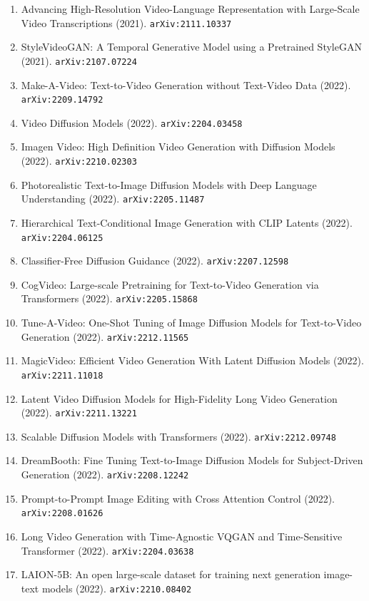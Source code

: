 \documentclass[11pt]{article}
\begin{document}
\begin{enumerate}
  and Perks of StyleGAN2 (2021). \texttt{arXiv:2112.14683}
  \item Advancing High-Resolution Video-Language Representation with Large-Scale
  Video Transcriptions (2021). \texttt{arXiv:2111.10337}
  \item StyleVideoGAN: A Temporal Generative Model using a Pretrained StyleGAN (2021). \texttt{arXiv:2107.07224}
  \item Make-A-Video: Text-to-Video Generation without Text-Video Data (2022). \texttt{arXiv:2209.14792}
  \item Video Diffusion Models (2022). \texttt{arXiv:2204.03458}
  \item Imagen Video: High Definition Video Generation with Diffusion Models (2022). \texttt{arXiv:2210.02303}
  \item Photorealistic Text-to-Image Diffusion Models with Deep Language
  Understanding (2022). \texttt{arXiv:2205.11487}
  \item Hierarchical Text-Conditional Image Generation with CLIP Latents (2022). \texttt{arXiv:2204.06125}
  \item Classifier-Free Diffusion Guidance (2022). \texttt{arXiv:2207.12598}
  \item CogVideo: Large-scale Pretraining for Text-to-Video Generation via
  Transformers (2022). \texttt{arXiv:2205.15868}
  \item Tune-A-Video: One-Shot Tuning of Image Diffusion Models for
  Text-to-Video Generation (2022). \texttt{arXiv:2212.11565}
  \item MagicVideo: Efficient Video Generation With Latent Diffusion Models (2022). \texttt{arXiv:2211.11018}
  \item Latent Video Diffusion Models for High-Fidelity Long Video Generation (2022). \texttt{arXiv:2211.13221}
  \item Scalable Diffusion Models with Transformers (2022). \texttt{arXiv:2212.09748}
  \item DreamBooth: Fine Tuning Text-to-Image Diffusion Models for
  Subject-Driven Generation (2022). \texttt{arXiv:2208.12242}
  \item Prompt-to-Prompt Image Editing with Cross Attention Control (2022). \texttt{arXiv:2208.01626}
  \item Long Video Generation with Time-Agnostic VQGAN and Time-Sensitive
  Transformer (2022). \texttt{arXiv:2204.03638}
  \item LAION-5B: An open large-scale dataset for training next generation
  image-text models (2022). \texttt{arXiv:2210.08402}

\end{enumerate}
\end{document}
